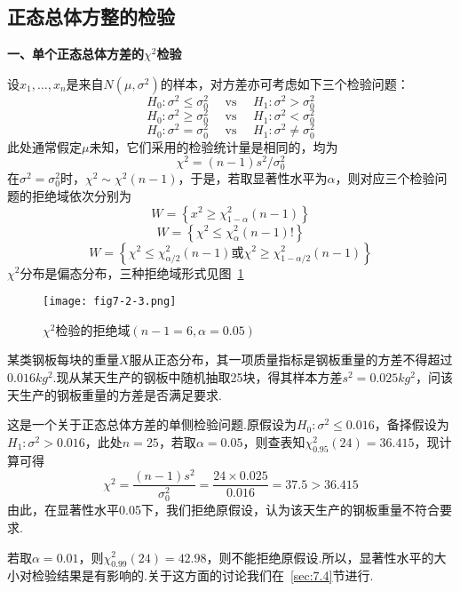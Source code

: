 \subsection{正态总体方整的检验\label{7.2.3}}

\textbf{一、单个正态总体方差的$\chi^{2}$检验}

设$x_{1},\dotsc,x_{n}$是来自$N(\mu ,\sigma^{2})$的样本，对方差亦可考虑如下三个检验问题：
\begin{equation}\label{eq7.2.22}
H _ { 0 } : \sigma ^ { 2 } \leq \sigma _ { 0 } ^ { 2 } \quad \text { vs } \quad H _ { 1 } : \sigma ^ { 2 } > \sigma _ { 0 } ^ { 2 }
\end{equation}
\begin{equation}\label{eq7.2.23}
H _ { 0 } : \sigma ^ { 2 } \geq \sigma _ { 0 } ^ { 2 } \quad \text { vs } \quad H _ { 1 } : \sigma ^ { 2 } < \sigma _ { 0 } ^ { 2 }
\end{equation}
\begin{equation}\label{eq7.2.24}
H _ { 0 } : \sigma ^ { 2 } = \sigma _ { 0 } ^ { 2 } \quad \text { vs } \quad H _ { 1 } : \sigma ^ { 2 } \ne  \sigma _ { 0 } ^ { 2 }
\end{equation}
此处通常假定$\mu$未知，它们采用的检验统计量是相同的，均为
\begin{equation}\label{eq7.2.25}
\chi ^ { 2 } = ( n - 1 ) s ^ { 2 } / \sigma _ { 0 } ^ { 2 }
\end{equation}
在$\sigma ^ { 2 } = \sigma _ { 0 } ^ { 2 }$时，$\chi ^ { 2 } \sim \chi ^ { 2 } ( n - 1 )$，于是，若取显著性水平为$\alpha$，则对应三个检验问题的拒绝域依次分别为
\[W = \left\{ x ^ { 2 } \geq \chi _ { 1 -\alpha } ^ { 2 } ( n - 1 ) \right\}\]
\[
W=\left\{\chi^2\le\chi_{\alpha}^{2}\left(n-1\right)!\right\}
\]
\[
W=\left\{\chi^2\le\chi_{\alpha/2}^{2}\left(n-1\right)\textrm{或}\chi^2\geq\chi_{1-\alpha/2}^{2}\left(n-1\right)\right\}
\]
$\chi^{2}$分布是偏态分布，三种拒绝域形式见图~\ref{fig7.2.3}
\begin{figure}[htbp]
	\centering
	\texttt{[image: fig7-2-3.png]}
	\caption{$\chi^{2}$检验的拒绝域$(n-1=6,\alpha=0.05)$}\label{fig7.2.3}
\end{figure}
\begin{example}\label{exam7.2.4}
	某类钢板每块的重量$X$服从正态分布，其一项质量指标是钢板重量的方差不得超过$0.016kg^{2}$.现从某天生产的钢板中随机抽取25块，得其样本方差$s^{2}=0.025kg^{2}$，问该天生产的钢板重量的方差是否满足要求.
\end{example}
\begin{solution}
	这是一个关于正态总体方差的单侧检验问题.原假设为$H _ { 0 } : \sigma ^ { 2 } \leq 0.016$，备择假设为$H _ { 1 } : \sigma ^ { 2 } > 0.016$，此处$n=25$，若取$\alpha=0.05$，则查表知$\chi _ { 0.95 } ^ { 2 } ( 24 ) = 36.415$，现计算可得
	\[\chi ^ { 2 } = \frac { ( n - 1 ) s ^ { 2 } } { \sigma _ { 0 } ^ { 2 } } = \frac { 24 \times 0.025 } { 0.016 } = 37.5 > 36.415\]
	由此，在显著性水平0.05下，我们拒绝原假设，认为该天生产的钢板重量不符合要求.
	
	若取$\alpha=0.01$，则$\chi _ { 0.99 } ^ { 2 } ( 24 ) = 42.98$，则不能拒绝原假设.所以，显著性水平的大小对检验结果是有影响的.关于这方面的讨论我们在~\ref{sec:7.4}节进行.
\end{solution}


